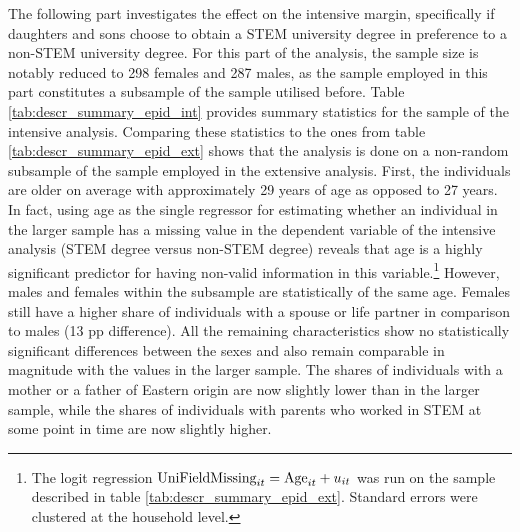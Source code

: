\documentclass[a4paper, oneside, hyperfootnotes = false]{article}
\begin{document}
{The following part investigates the effect on the intensive margin, specifically if daughters and sons choose to obtain a STEM university degree in preference to a non-STEM university degree.
For this part of the analysis, the sample size is notably reduced to 298 females and 287 males, as the sample employed in this part constitutes a subsample of the sample utilised before.
Table \ref{tab:descr_summary_epid_int} provides summary statistics for the sample of the intensive analysis.
Comparing these statistics to the ones from table \ref{tab:descr_summary_epid_ext} shows that the analysis is done on a non-random subsample of the sample employed in the extensive analysis.
First, the individuals are older on average with approximately 29 years of age as opposed to 27 years.
In fact, using age as the single regressor for estimating whether an individual in the larger sample has a missing value in the dependent variable of the intensive analysis (STEM degree versus non-STEM degree) reveals that age is a highly significant predictor for having non-valid information in this variable.\footnote{The logit regression $\textnormal{UniFieldMissing}_{it} = \textnormal{Age}_{it} + u_{it}$ was run on the sample described in table \ref{tab:descr_summary_epid_ext}. Standard errors were clustered at the household level.}
However, males and females within the subsample are statistically of the same age.
Females still have a higher share of individuals with a spouse or life partner in comparison to males (13 pp difference).
All the remaining characteristics  show no statistically significant differences between the sexes and also remain comparable in magnitude with the values in the larger sample.
The shares of individuals with a mother or a father of Eastern origin are now slightly lower than in the larger sample, while the shares of individuals with parents who worked in STEM at some point in time are now slightly higher.

}
\end{document}
